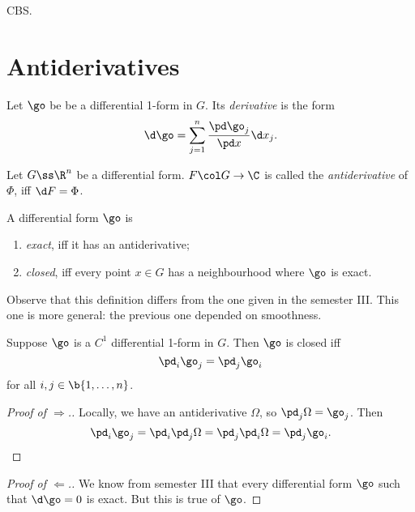 \begin{idea}
  CBS.
\end{idea}

\section{Antiderivatives}

\begin{definition}
  Let $\go$ be be a differential 1-form in $G$.
  Its \emph{derivative} is the form
  $$ \d \go = \sum_{j=1}^n \frac{\pd \go_j}{\pd x} \d x_j. $$
\end{definition}

\begin{definition}
  Let $G \ss \R^n$ be a differential form.
  $F \col G \to \C$ is called the \emph{antiderivative} of $\Phi$, iff $\d F = \Phi$. 
\end{definition}

\begin{definition}
  A differential form $\go$ is
  \begin{enumerate}
    \item \emph{exact}, iff it has an antiderivative;
    \item \emph{closed}, iff every point $x \in G$ has a neighbourhood where $\go$ is exact.
  \end{enumerate}
\end{definition}

  Observe that this definition differs from the one given in the semester III. This one is more general: the previous one depended on smoothness.

\begin{lemma}
  Suppose $\go$ is a $C^1$ differential 1-form in $G$.
  Then $\go$ is closed iff
  $$ \pd_i \go_j = \pd_j \go_i $$
  for all $i, j \in \b{1, \dots, n}$.
\end{lemma}

\begin{proof}[Proof of $\Rightarrow$.]
  Locally, we have an antiderivative $\Omega$, so $\pd_j \Omega = \go_j$.
  Then
  $$ \pd_i \go_j = \pd_{i} \pd_j \Omega = \pd_j \pd_i \Omega = \pd_j \go_i. $$
\end{proof}

\begin{proof}[Proof of $\Leftarrow$.]
  We know from semester III that every differential form $\go$ such that $\d \go = 0$ is exact. But this is true of $\go$.
\end{proof}

